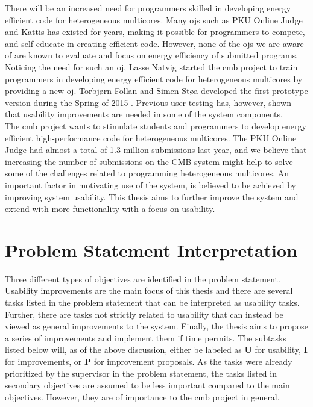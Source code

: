 There will be an increased need for programmers skilled in developing energy efficient code for heterogeneous multicores. Many \glspl{oj} such as PKU Online Judge \cite{PKU} and Kattis \cite{KATTIS} has existed for years, making it possible for programmers to compete, and self-educate in creating efficient code. However, none of the \glspl{oj} we are aware of are known to evaluate and focus on energy efficiency of submitted programs. Noticing the need for such an \gls{oj}, Lasse Natvig started the \gls{cmb} project to train programmers in developing energy efficient code for heterogeneous multicores by providing a new \gls{oj}. Torbjørn Follan and Simen Støa developed the first prototype version during the Spring of 2015 \cite{mt:T&S}. Previous user testing has, however, shown that usability improvements are needed in some of the system components. \\

The \gls{cmb} project wants to stimulate students and programmers to develop energy efficient high-performance code for heterogeneous multicores. The PKU Online Judge \cite{PKU} had almost a total of 1.3 million submissions last year, and we believe that increasing the number of submissions on the CMB system might help to solve some of the challenges related to programming heterogeneous multicores. An important factor in motivating use of the system, is believed to be achieved by improving system usability. This thesis aims to further improve the system and extend with more functionality with a focus on usability. \\

\section{Problem Statement Interpretation}
\label{sec:ps-inter}
Three different types of objectives are identified in the problem statement. Usability improvements are the main focus of this thesis and there are several tasks listed in the problem statement that can be interpreted as usability tasks. Further, there are tasks not strictly related to usability that can instead be viewed as general improvements to the system. Finally, the thesis aims to propose a series of improvements and implement them if time permits. The subtasks listed below will, as of the above discussion, either be labeled as \textbf{U} for usability, \textbf{I} for improvements, or \textbf{P} for improvement proposals. As the tasks were already prioritized by the supervisor in the problem statement, the tasks listed in secondary objectives are assumed to be less important compared to the main objectives. However, they are of importance to the \gls{cmb} project in general.

